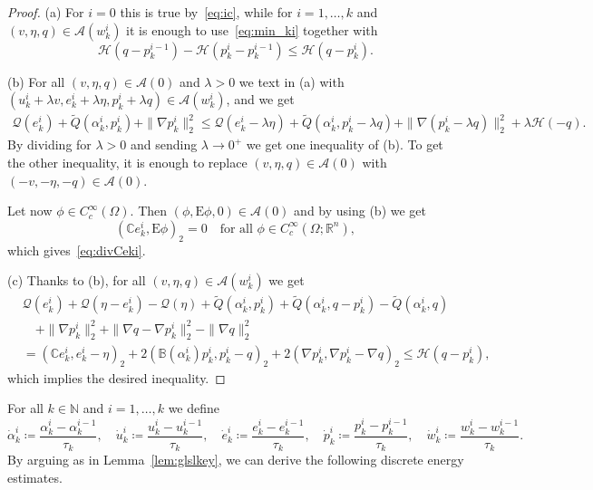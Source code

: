 \documentclass[reqno]{amsart}
\theoremstyle{definition}
\numberwithin{equation}{section}
\def\R {\mathbb R}
\def\N {\mathbb N}
\def\C {\mathbb C}
\def\B {\mathbb B}
\def\EE {\mathrm{E}}
\begin{document}
\begin{proof}
(a) For $i=0$ this is true by~\eqref{eq:ic}, while for $i=1,\dots,k$ and $(v,\eta,q)\in \mathcal A(w_k^i)$ it is enough to use~\eqref{eq:min_ki} together with
\begin{equation*}
\mathcal H(q-p_k^{i-1})-\mathcal H(p_k^i-p_k^{i-1})\le \mathcal H(q-p_k^i).
\end{equation*}

(b) For all $(v,\eta,q)\in \mathcal A(0)$ and $\lambda>0$ we text in (a) with  $(u_k^i+\lambda v,e_k^i+\lambda \eta,p_k^i+\lambda q)\in \mathcal A(w_k^i)$, and we get
\begin{align*}
\mathcal Q(e_k^i)+\tilde Q(\alpha_k^i,p_k^i)+\|\nabla p_k^i\|_2^2\le \mathcal Q(e_k^i-\lambda \eta)+\tilde Q(\alpha_k^i,p_k^i-\lambda q)+\|\nabla (p_k^i-\lambda q)\|_2^2+\lambda\mathcal H(-q).
\end{align*}
By dividing for $\lambda>0$ and sending $\lambda\to 0^+$ we get one inequality of (b). To get the other inequality, it is enough to replace $(v,\eta,q)\in\mathcal A(0)$ with $(-v,-\eta,-q)\in\mathcal A(0)$. 

Let now $\phi\in C_c^\infty(\Omega)$. Then $(\phi,\EE\phi,0)\in \mathcal A(0)$ and by using (b) we get
$$(\C e_k^i,\EE\phi)_2=0\quad\text{for all $\phi\in C_c^\infty(\Omega;\R^n)$},$$
which gives~\eqref{eq:divCeki}.

(c) Thanks to (b), for all $(v,\eta,q)\in \mathcal A(w_k^i)$ we get
\begin{align*}
&\mathcal Q(e_k^i)+\mathcal Q(\eta-e_k^i)-\mathcal Q(\eta)+\tilde Q(\alpha_k^i,p_k^i)+\tilde Q(\alpha_k^i,q-p_k^i)-\tilde Q(\alpha_k^i,q)\\
&\quad+\|\nabla p_k^i\|_2^2+\|\nabla q-\nabla p_k^i\|_2^2-\|\nabla q\|_2^2\\
&=(\C e_k^i,e_k^i-\eta)_2+2(\B(\alpha_k^i)p_k^i,p_k^i-q)_2+2(\nabla p_k^i,\nabla p_k^i-\nabla q)_2\le \mathcal H(q-p_k^i),
\end{align*}
which implies the desired inequality.
\end{proof}

For all $k\in\N$ and $i=1,\dots,k$ we define
\begin{equation*}\dot\alpha_k^i\coloneqq \frac{\alpha_k^i-\alpha_k^{i-1}}{\tau_k},\quad \dot u_k^i\coloneqq \frac{u_k^i-u_k^{i-1}}{\tau_k},\quad \dot e_k^i\coloneqq \frac{e_k^i-e_k^{i-1}}{\tau_k},\quad \dot p_k^i\coloneqq \frac{ p_k^i-p_k^{i-1}}{\tau_k},\quad \dot w_k^i\coloneqq \frac{w_k^i-w_k^{i-1}}{\tau_k}.\end{equation*}
By arguing as in Lemma~\ref{lem:glslkey}, we can derive the following discrete energy estimates.
\end{document}
